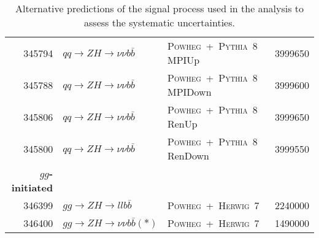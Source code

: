 \begin{table}[hb]
{\begin{tabular}{rllr}
      345794 & $qq\to ZH \to \nu\nu b\bar{b}$  & \textsc{Powheg}~+~\textsc{Pythia}~8  MPIUp & 3999650 \\
      345788 & $qq\to ZH \to \nu\nu b\bar{b}$  & \textsc{Powheg}~+~\textsc{Pythia}~8  MPIDown & 3999600 \\
      345806 & $qq\to ZH \to \nu\nu b\bar{b}$  & \textsc{Powheg}~+~\textsc{Pythia}~8  RenUp & 3999650 \\
      345800 & $qq\to ZH \to \nu\nu b\bar{b}$  & \textsc{Powheg}~+~\textsc{Pythia}~8  RenDown & 3999550 \\
      {\bfseries $gg$-initiated} & & & \\
      346399 & $gg\to ZH \to ll b\bar{b}$    & \textsc{Powheg}~+~\textsc{Herwig}~7   & 2240000 \\
      346400 & $gg\to ZH \to \nu\nu b\bar{b}(*) $  &  \textsc{Powheg}~+~\textsc{Herwig}~7   &  1490000 \\
      \bottomrule
    \end{tabular}
  }
  \caption[Alternative predictions of the \VHbb signal process.]{Alternative
    predictions of the \VHbb signal process used in the analysis to assess the
    systematic uncertainties.}
  \label{tab:VHSMsignals-alt}
\end{table}